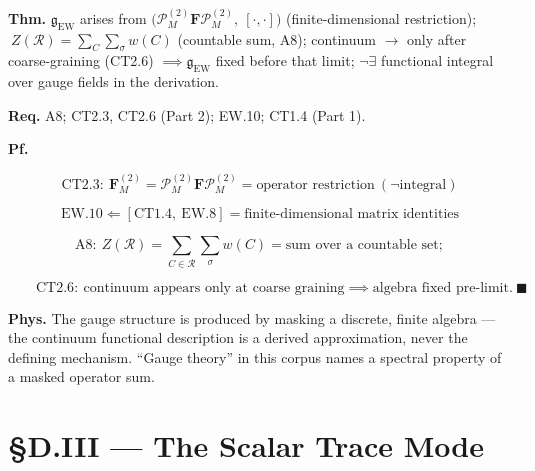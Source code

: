 \begin{theorem}\label{tag:EW-11}
\textbf{Thm.} $\mathfrak g_{\mathrm{EW}}$ arises from $\bigl(\mathcal P_M^{(2)}\mathbf F\mathcal P_M^{(2)},\ [\cdot,\cdot]\bigr)$ (finite-dimensional restriction); $\ Z(\mathcal R)=\sum_{C}\sum_\sigma w(C)$ (countable sum, A8); continuum $\to$ only after coarse-graining (CT2.6) $\implies\mathfrak g_{\mathrm{EW}}$ fixed before that limit; $\neg\exists$ functional integral over gauge fields in the derivation.

\textbf{Req.} A8; CT2.3, CT2.6 (Part 2); EW.10; CT1.4 (Part 1).

\textbf{Pf.}

\[
\mathrm{CT2.3}:\ \mathbf F_M^{(2)}=\mathcal P_M^{(2)}\mathbf F\mathcal P_M^{(2)}=\text{operator restriction}\ (\neg\text{integral})
\]

\[
\mathrm{EW.10}\Leftarrow[\mathrm{CT1.4},\ \mathrm{EW.8}]=\text{finite-dimensional matrix identities}
\]

\[
\mathrm{A8}:\ Z(\mathcal R)=\textstyle\sum_{C\in\mathcal R}\sum_\sigma w(C)=\text{sum over a countable set};
\]

\[
\qquad \mathrm{CT2.6}:\ \text{continuum appears only at coarse graining}\implies\text{algebra fixed pre-limit}.\ \blacksquare
\]

\textbf{Phys.} The gauge structure is produced by masking a discrete, finite algebra — the continuum functional description is a derived approximation, never the defining mechanism. “Gauge theory” in this corpus names a spectral property of a masked operator sum.

\end{theorem}

\section[§D.III — The Scalar Trace Mode]{\texorpdfstring{§D.III — The Scalar Trace Mode}{SD.III - The Scalar Trace Mode}}

